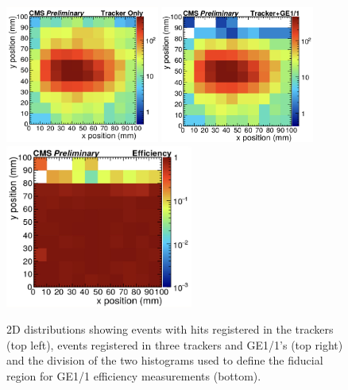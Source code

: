 \begin{figure}[htbp]
    \centering
    \includegraphics[width=0.45\textwidth]{figures/GEM/FiducialAreaCal_TrackerOnly.jpeg}%
    \includegraphics[width=0.45\textwidth]{figures/GEM/FiducialAreaCal_TrackerGE11.jpeg}\\
    \includegraphics[width=0.55\textwidth]{figures/GEM/FiducialAreaCal_Selection.jpeg}\\
    \caption{2D distributions showing events with hits registered in the trackers (top left), events registered in three trackers and GE1/1's (top right) and the division of the two histograms used to define the fiducial region for GE1/1 efficiency measurements (bottom).}
    \label{fig:fiducial_area_sel}
\end{figure}
